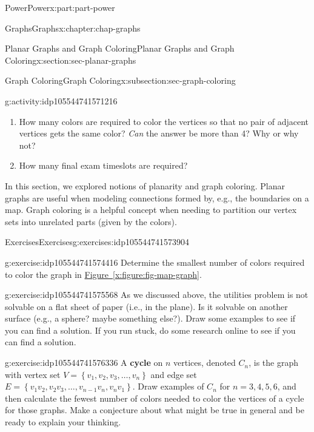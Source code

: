 \documentclass[oneside,10pt,]{book}
\newcommand{\xreffont}{\relax}
\newcommand{\terminology}[1]{\textbf{#1}}
\numberwithin{equation}{section}
\newcommand{\set}[1]{\left\{ {#1} \right\}}
\begin{document}
\begin{partptx}{Power}{}{Power}{}{}{x:part:part-power}
\begin{chapterptx}{Graphs}{}{Graphs}{}{}{x:chapter:chap-graphs}
\begin{sectionptx}{Planar Graphs and Graph Coloring}{}{Planar Graphs and Graph Coloring}{}{}{x:section:sec-planar-graphs}
\begin{subsectionptx}{Graph Coloring}{}{Graph Coloring}{}{}{x:subsection:sec-graph-coloring}
\begin{activity}{}{g:activity:idp105544741571216}
\begin{enumerate}
\item{}How many colors are required to color the vertices so that no pair of adjacent vertices gets the same color? \emph{Can} the answer be more than 4? Why or why not?%
\item{}How many final exam timeslots are required?%
\end{enumerate}
\end{activity}%
\end{subsectionptx}
\begin{conclusion}{}%
In this section, we explored notions of planarity and graph coloring. Planar graphs are useful when modeling connections formed by, e.g., the boundaries on a map. Graph coloring is a helpful concept when needing to partition our vertex sets into unrelated parts (given by the colors).%
\end{conclusion}%
%
%
\typeout{************************************************}
\typeout{************************************************}
%
\begin{exercises-subsection}{Exercises}{}{Exercises}{}{}{g:exercises:idp105544741573904}
\begin{divisionexercise}{1}{}{}{g:exercise:idp105544741574416}%
Determine the smallest number of colors required to color the graph in \hyperref[x:figure:fig-map-graph]{Figure~{\xreffont\ref{x:figure:fig-map-graph}}}.%
\end{divisionexercise}%
\begin{divisionexercise}{2}{}{}{g:exercise:idp105544741575568}%
As we discussed above, the utilities problem is not solvable on a flat sheet of paper (i.e., in the plane). Is it solvable on another surface (e.g., a sphere? maybe something else?). Draw some examples to see if you can find a solution. If you run stuck, do some research online to see if you can find a solution.%
\end{divisionexercise}%
\begin{divisionexercise}{3}{}{}{g:exercise:idp105544741576336}%
A \terminology{cycle} on \(n\) vertices, denoted \(C_n\), is the graph with vertex set \(V = \set{v_1, v_2, v_3, \ldots, v_n}\) and edge set \(E = \set{v_1 v_2, v_2 v_3, \ldots, v_{n-1} v_n, v_n v_1}\). Draw examples of \(C_n\) for \(n = 3, 4, 5, 6\), and then calculate the fewest number of colors needed to color the vertices of a cycle for those graphs. Make a conjecture about what might be true in general and be ready to explain your thinking.%
\end{divisionexercise}%
\end{exercises-subsection}

\end{sectionptx}
\end{chapterptx}
\end{partptx}
\end{document}
